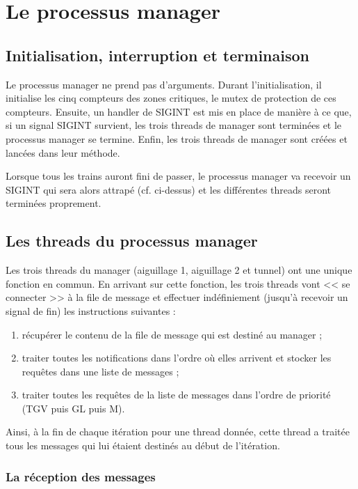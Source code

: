 \documentclass[a4paper,12pt]{article}
\begin{document}
\section{Le processus manager}

\subsection{Initialisation, interruption et terminaison}

Le processus manager ne prend pas d'arguments. Durant l'initialisation, il initialise les cinq compteurs des zones critiques, le mutex de protection de ces compteurs. Ensuite, un handler de SIGINT est mis en place de manière à ce que, si un signal SIGINT survient, les trois threads de manager sont terminées et le processus manager se termine. Enfin, les trois threads de manager sont créées et lancées dans leur méthode.

Lorsque tous les trains auront fini de passer, le processus manager va recevoir un SIGINT qui sera alors attrapé (cf. ci-dessus) et les différentes threads seront terminées proprement.

\subsection{Les threads du processus manager}

Les trois threads du manager (aiguillage 1, aiguillage 2 et tunnel) ont une unique fonction en commun. En arrivant sur cette fonction, les trois threads vont << se connecter >> à la file de message et effectuer indéfiniement (jusqu'à recevoir un signal de fin) les instructions suivantes :

\begin{enumerate}
    \item récupérer le contenu de la file de message qui est destiné au manager ;
    \item traiter toutes les notifications dans l'ordre où elles arrivent et stocker les requêtes dans une liste de messages ;
    \item traiter toutes les requêtes de la liste de messages dans l'ordre de priorité (TGV puis GL puis M).
\end{enumerate}

Ainsi, à la fin de chaque itération pour une thread donnée, cette thread a traitée tous les messages qui lui étaient destinés au début de l'itération.

\subsubsection{La réception des messages}
\end{document}
